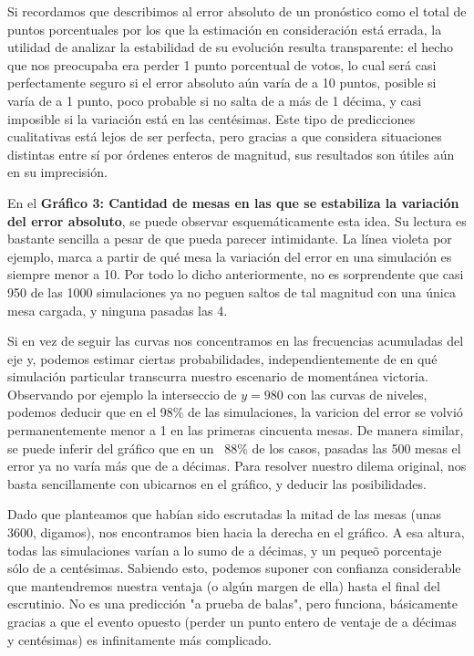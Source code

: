 \documentclass[12pt, a4paper]{article}
\begin{document}
Si recordamos que describimos al error absoluto de un pron\'ostico como el total de puntos porcentuales por los que la estimaci\'on en consideraci\'on est\'a errada,  la utilidad de analizar la estabilidad de su evoluci\'on resulta transparente: el hecho que nos preocupaba era perder 1 punto porcentual de votos, lo cual ser\'a casi perfectamente seguro si el error absoluto a\'un var\'ia de a 10 puntos, posible si var\'ia de a 1 punto, poco probable si no salta de a m\'as de 1 d\'ecima, y casi imposible si la variaci\'on est\'a en las cent\'esimas. Este tipo de predicciones cualitativas est\'a lejos de ser perfecta, pero gracias a que considera situaciones distintas entre s\'i por \'ordenes enteros de magnitud, sus resultados son \'utiles a\'un en su imprecisi\'on.

En el \textbf{Gr\'afico 3: Cantidad de mesas en las que se estabiliza la variaci\'on del error absoluto}, se puede observar esquem\'aticamente esta idea. Su lectura es bastante sencilla a pesar de que pueda parecer intimidante. La l\'inea violeta por ejemplo, marca a partir de qu\'e mesa la variaci\'on del error en una simulaci\'on es siempre menor a 10. Por todo lo dicho anteriormente, no es sorprendente que casi 950 de las 1000 simulaciones ya no peguen saltos de tal magnitud con una \'unica mesa cargada, y ninguna pasadas las 4. 

Si en vez de seguir las curvas nos concentramos en las frecuencias acumuladas del eje y, podemos estimar ciertas probabilidades, independientemente de en qu\'e simulaci\'on particular transcurra nuestro escenario de moment\'anea victoria. Observando por ejemplo la interseccio de $y=980$ con las curvas de niveles, podemos deducir que en el 98\% de las simulaciones, la varicion del error se volvi\'o permanentemente menor a 1 en las primeras cincuenta mesas. De manera similar, se puede inferir del gr\'afico que en un ~88\% de los casos, pasadas las 500 mesas el error ya no var\'ia m\'as que de a d\'ecimas. Para resolver nuestro dilema original, nos basta sencillamente con ubicarnos en el gr\'afico, y deducir las posibilidades.

Dado que planteamos que hab\'ian sido escrutadas la mitad de las mesas (unas 3600, digamos), nos encontramos bien hacia la derecha en el gr\'afico. A esa altura, todas las simulaciones var\'ian a lo sumo de a d\'ecimas, y un peque\~o porcentaje s\'olo de a cent\'esimas. Sabiendo esto, podemos suponer con confianza considerable que mantendremos nuestra ventaja (o alg\'un margen de ella) hasta el final del escrutinio. No es una predicci\'on "a prueba de balas", pero funciona, b\'asicamente gracias a que el evento opuesto (perder un punto entero de ventaje de a d\'ecimas y cent\'esimas) es infinitamente m\'as complicado.
\end{document}
